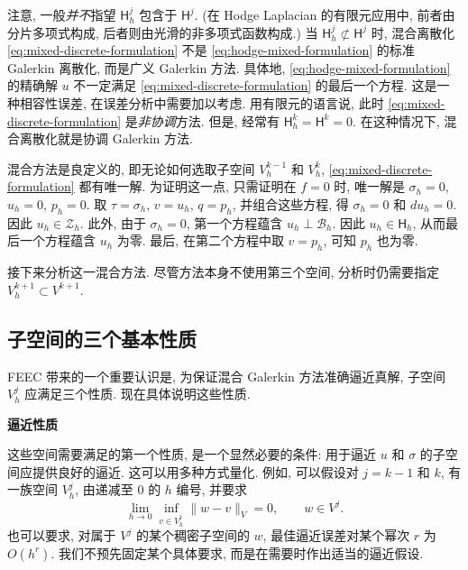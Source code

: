 {注意, 一般\emph{并不}指望 $\mathsf H_h^j$ 包含于 $\mathsf H^j$. (在 Hodge Laplacian 的有限元应用中, 前者由分片多项式构成, 后者则由光滑的非多项式函数构成.) 当 $\mathsf H_h^j\not\subset\mathsf H^j$ 时, 混合离散化 \eqref{eq:mixed-discrete-formulation} 不是 \eqref{eq:hodge-mixed-formulation} 的标准 Galerkin 离散化, 而是广义 Galerkin 方法. 具体地, \eqref{eq:hodge-mixed-formulation} 的精确解 $u$ 不一定满足 \eqref{eq:mixed-discrete-formulation} 的最后一个方程. 这是一种相容性误差, 在误差分析中需要加以考虑. 用有限元的语言说, 此时 \eqref{eq:mixed-discrete-formulation} 是\emph{非协调}方法. 但是, 经常有 $\mathsf H_h^k=\mathsf H^k=0$. 在这种情况下, 混合离散化就是协调 Galerkin 方法.}

{混合方法是良定义的, 即无论如何选取子空间 $V_h^{k-1}$ 和 $V_h^k$, \eqref{eq:mixed-discrete-formulation} 都有唯一解. 为证明这一点, 只需证明在 $f=0$ 时, 唯一解是 $\sigma_h=0$, $u_h=0$, $p_h=0$. 取 $\tau=\sigma_h$, $v=u_h$, $q=p_h$, 并组合这些方程, 得 $\sigma_h=0$ 和 $du_h=0$. 因此 $u_h\in\mathcal Z_h$. 此外, 由于 $\sigma_h=0$, 第一个方程蕴含 $u_h\perp\mathcal B_h$. 因此 $u_h\in\mathsf H_h$, 从而最后一个方程蕴含 $u_h$ 为零. 最后, 在第二个方程中取 $v=p_h$, 可知 $p_h$ 也为零.}

{接下来分析这一混合方法. 尽管方法本身不使用第三个空间, 分析时仍需要指定 $V_h^{k+1}\subset V^{k+1}$.}

\subsection{{子空间的三个基本性质}}\label{subsec:mixed-three-properties}

{FEEC 带来的一个重要认识是, 为保证混合 Galerkin 方法准确逼近真解, 子空间 $V_h^j$ 应满足三个性质. 现在具体说明这些性质.}

\medskip\noindent\textbf{{逼近性质}}\par
{这些空间需要满足的第一个性质, 是一个显然必要的条件: 用于逼近 $u$ 和 $\sigma$ 的子空间应提供良好的逼近. 这可以用多种方式量化. 例如, 可以假设对 $j=k-1$ 和 $k$, 有一族空间 $V_h^j$, 由递减至 $0$ 的 $h$ 编号, 并要求}
\begin{equation}\label{eq:galerkin-approximation-property}
\lim_{h\to0}\inf_{v\in V_h^j}\|w-v\|_V=0,\qquad w\in V^j.
\end{equation}
{也可以要求, 对属于 $V^j$ 的某个稠密子空间的 $w$, 最佳逼近误差对某个幂次 $r$ 为 $O(h^r)$. 我们不预先固定某个具体要求, 而是在需要时作出适当的逼近假设.}


